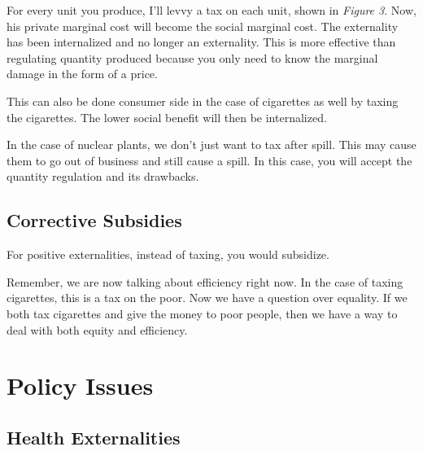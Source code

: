 \documentclass{article}
\begin{document}
For every unit you produce, I'll levvy a tax on each unit, shown in
\textit{Figure 3}. Now, his private marginal cost will become the social
marginal cost. The externality has been internalized and no longer an
externality. This is more effective than regulating quantity produced because
you only need to know the marginal damage in the form of a price.

This can also be done consumer side in the case of cigarettes as well by taxing
the cigarettes. The lower social benefit will then be internalized.

In the case of nuclear plants, we don't just want to tax after spill. This may
cause them to go out of business and still cause a spill. In this case, you will
accept the quantity regulation and its drawbacks. 

\subsection{ Corrective Subsidies }

For positive externalities, instead of taxing, you would subsidize. 

\bigbreak

Remember, we are now talking about efficiency right now. In the case of taxing
cigarettes, this is a tax on the poor. Now we have a question over equality. If
we both tax cigarettes and give the money to poor people, then we have a way to
deal with both equity and efficiency.

\section{ Policy Issues }

\subsection{ Health Externalities }
\end{document}
